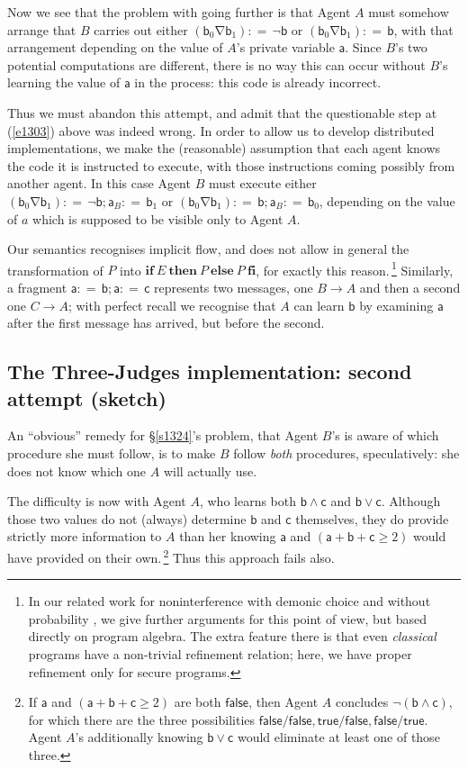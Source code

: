 \documentclass[runningheads]{llncs}
\newcommand\Va {\mathsf{a}}
\newcommand\Vb {\mathsf{b}}
\newcommand\Vc {\mathsf{c}}
\newcommand\Sec[1] {Sec.~\ref{#1}}
\renewcommand\Sec[1] {\S\ref{#1}}
\newcommand\Eqn[1] {(\ref{#1})}
\newcommand\Gets {{:}{=}\,}
\newcommand\If {\textbf{if}}
\newcommand\Then {\textbf{then}}
\newcommand\Else {\textbf{else}}
\newcommand\Fi {\textbf{fi}}
\newcommand\True {\textsf{true}}
\newcommand\False {\textsf{false}}
\newcommand\Xor {\mathbin{\nabla}}
\begin{document}
Now we see that the problem with going further is that Agent $A$ must somehow arrange that $B$ carries out either $(\Vb_{0}{\Xor}\Vb_{1})\Gets \neg \Vb$ or $(\Vb_{0}{\Xor}\Vb_{1})\Gets \Vb$, with that arrangement depending on the value of $A$'s private variable $\Va$. Since $B$'s two potential computations are different, there is no way this can occur without $B$'s learning the value of $\Va$ in the process: this code is already incorrect.

Thus we must abandon this attempt, and admit that the questionable step at \Eqn{e1303} above was indeed wrong.
In order to allow us to develop distributed implementations, we make the (reasonable) assumption that each agent knows the code it is instructed to execute, with those instructions coming possibly from another agent. In this case Agent $B$ must execute either $(\Vb_{0}{\Xor}\Vb_{1})\Gets \neg \Vb; \Va_{B}\Gets \Vb_{1}$ or $(\Vb_{0}{\Xor}\Vb_{1})\Gets \Vb; \Va_{B}\Gets \Vb_{0}$, depending on the value of $a$ which is supposed to be visible only to Agent $A$.


Our semantics recognises implicit flow, and does not allow in general the transformation of $P$ into $\If~E~\Then~P~\Else~P~\Fi$, for exactly this reason.\,\footnote{In our related work for noninterference with demonic choice and without probability \cite{Morgan:06,Morgan:07}, we give further arguments for this point of view, but based directly on program algebra. The extra feature there is that even \emph{classical} programs have a non-trivial refinement relation; here, we have proper refinement only for secure programs.}
Similarly, a fragment $\Va\Gets \Vb; \Va\Gets \Vc$ represents two messages, one $B{\rightarrow}A$ and then a second one $C{\rightarrow}A$; with perfect recall we recognise that $A$ can learn $\Vb$ by examining $\Va$ after the first message has arrived, but before the second.

\subsection{The Three-Judges implementation: second attempt (sketch)}\label{s1203}

An ``obvious'' remedy for \Sec{s1324}'s problem, that Agent $B$'s is aware of which procedure she must follow, is to make $B$ follow \emph{both} procedures, speculatively: she does not know which one $A$ will actually use.

The difficulty is now with Agent $A$, who learns both $\Vb\land \Vc$ and $\Vb\lor \Vc$. Although those two values do not (always) determine $\Vb$ and $\Vc$ themselves, they do provide strictly more information to $A$ than her knowing $\Va$ and $(\Va{+}\Vb{+}\Vc \geq 2)$ would have provided on their own.\,\footnote{If $\Va$ and $(\Va{+}\Vb{+}\Vc \geq 2)$ are both $\False$, then Agent $A$ concludes $\neg(\Vb{\land}\Vc)$, for which there are the three possibilities $\False/\False, \True/\False,\False/\True$. Agent $A$'s additionally knowing $\Vb\lor \Vc$ would eliminate at least one of those three.}
Thus this approach fails also.
\end{document}
